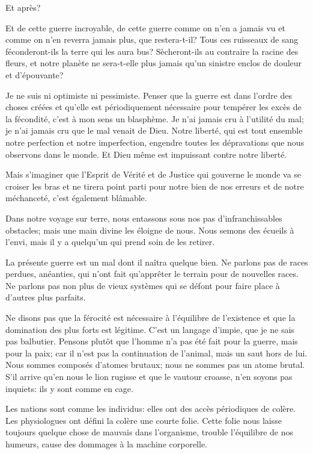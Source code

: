 \begin{chapter}{Et après?}

Et de cette guerre incroyable, de cette guerre comme on n'en a jamais vu
et comme on n'en reverra jamais plus, que restera-t-il? Tous ces
ruisseaux de sang féconderont-ils la terre qui les aura bus?
Sècheront-ils au contraire la racine des fleurs, et notre planète ne
sera-t-elle plus jamais qu'un sinistre enclos de douleur et d'épouvante?

Je ne suis ni optimiste ni pessimiste. Penser que la guerre est dans
l'ordre des choses créées et qu'elle est périodiquement nécessaire pour
tempérer les excès de la fécondité, c'est à mon sens un blasphème. Je
n'ai jamais cru à l'utilité du mal; je n'ai jamais cru que le mal venait
de Dieu. Notre liberté, qui est tout ensemble notre perfection et notre
imperfection, engendre toutes les dépravations que nous observons dans
le monde. Et Dieu même est impuissant contre notre liberté.

Mais s'imaginer que l'Esprit de Vérité et de Justice qui gouverne le
monde va se croiser les bras et ne tirera point parti pour notre bien de
nos erreurs et de notre méchanceté, c'est également blâmable.

Dans notre voyage sur terre, nous entassons sous nos pas
d'infranchissables obstacles; mais une main divine les éloigne de nous.
Nous semons des écueils à l'envi, mais il y a quelqu'un qui prend soin
de les retirer.

La présente guerre est un mal dont il naîtra quelque bien. Ne parlons
pas de races perdues, anéanties, qui n'ont fait qu'apprêter le terrain
pour de nouvelles races. Ne parlons pas non plus de vieux systèmes qui
se défont pour faire place à d'autres plus parfaits.

Ne disons pas que la férocité est nécessaire à l'équilibre de
l'existence et que la domination des plus forts est légitime. C'est un
langage d'impie, que je ne sais pas balbutier. Pensons plutôt que
l'homme n'a pas été fait pour la guerre, mais pour la paix; car il n'est
pas la continuation de l'animal, mais un saut hors de lui. Nous sommes
composés d'atomes brutaux; nous ne sommes pas un atome brutal. S'il
arrive qu'en nous le lion rugisse et que le vautour croasse, n'en soyons
pas inquiets: ils y sont comme en cage.

Les nations sont comme les individus: elles ont des accès périodiques de
colère. Les physiologues ont défini la colère une courte folie. Cette
folie nous laisse toujours quelque chose de mauvais dans l'organisme,
trouble l'équilibre de nos humeurs, cause des dommages à la machine
corporelle.


\end{chapter}
